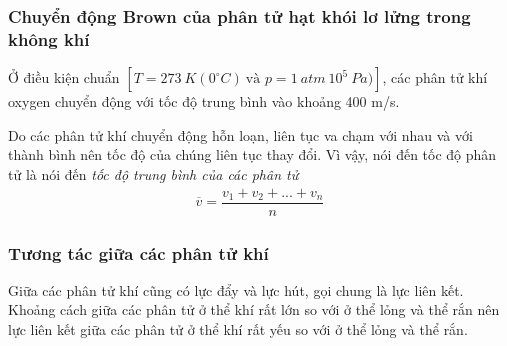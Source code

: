 \subsubsection{Chuyển động Brown của phân tử hạt khói lơ lửng trong không khí}
{
Ở điều kiện chuẩn $[T=273\ K (0^\circ C)\ \text{và } p=1\ atm\ 10^5\ Pa)]$, các phân tử khí oxygen chuyển động với tốc độ trung bình vào khoảng 400 m/s.
}
\begin{note}
	Do các phân tử khí chuyển động hỗn loạn, liên tục va chạm với nhau và với thành bình nên tốc độ của chúng liên tục thay đổi. Vì vậy, nói đến tốc độ phân tử là nói đến \textit{tốc độ trung bình của các phân tử}\\
	\begin{align*}
		\overline{v}=\dfrac{v_1+v_2+...+v_n}{n}
	\end{align*}
\end{note}
\subsubsection{Tương tác giữa các phân tử khí}
Giữa các phân tử khí cũng có lực đẩy và lực hút, gọi chung là lực liên kết. Khoảng cách giữa các phân tử ở thể khí rất lớn so với ở thể lỏng và thể rắn nên lực liên kết giữa các phân tử ở thể khí rất yếu so với ở thể lỏng và thể rắn.

